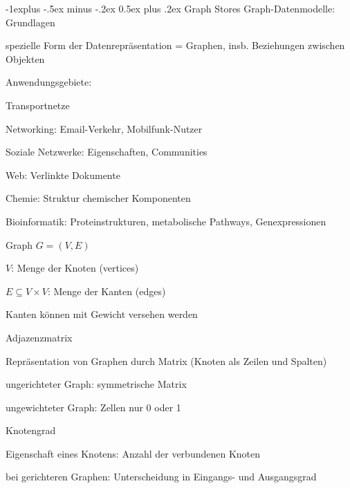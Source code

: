 \documentclass[a4paper]{article}
\makeatletter
\renewcommand{\subsection}{\@startsection{subsection}{2}{0mm}%
                                {-1explus -.5ex minus -.2ex}%
                                {0.5ex plus .2ex}%
                                {\normalfont\normalsize\bfseries}}
\makeatother
\begin{document}
\begin{multicols}{3}
\begin{itemize*}
    \subsection{Graph Stores}
    Graph-Datenmodelle: Grundlagen
    \begin{itemize*}
        \item spezielle Form der Datenrepräsentation = Graphen, insb. Beziehungen zwischen Objekten
        \item Anwendungsgebiete:
        \begin{itemize*}
            \item Transportnetze
            \item Networking: Email-Verkehr, Mobilfunk-Nutzer
            \item Soziale Netzwerke: Eigenschaften, Communities
            \item Web: Verlinkte Dokumente
            \item Chemie: Struktur chemischer Komponenten
            \item Bioinformatik: Proteinstrukturen, metabolische Pathways, Genexpressionen
        \end{itemize*}
        \item Graph $G = (V, E)$
        \begin{itemize*}
            \item $V$: Menge der Knoten (vertices)
            \item $E \subseteq V \times V$: Menge der Kanten (edges)
            \item Kanten können mit Gewicht versehen werden
        \end{itemize*}
        \item Adjazenzmatrix
        \begin{itemize*}
            \item Repräsentation von Graphen durch Matrix (Knoten als Zeilen und Spalten)
            \item ungerichteter Graph: symmetrische Matrix
            \item ungewichteter Graph: Zellen nur 0 oder 1
        \end{itemize*}
        \item Knotengrad
        \begin{itemize*}
            \item Eigenschaft eines Knotens: Anzahl der verbundenen Knoten
            \item bei gerichteren Graphen: Unterscheidung in Eingangs- und Ausgangsgrad

\end{itemize*}
\end{itemize*}
\end{itemize*}
\end{multicols}
\end{document}
